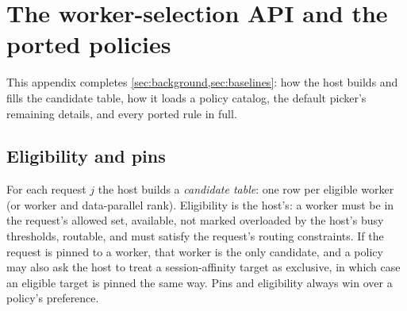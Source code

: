 %

\section{The worker-selection API and the ported policies}
\label{app:api}

This appendix completes \cref{sec:background,sec:baselines}: how the host builds and fills the
candidate table, how it loads a policy catalog, the default picker's remaining details, and every
ported rule in full.

\subsection{Eligibility and pins}

For each request $j$ the host builds a \emph{candidate table}: one row per eligible worker (or
worker and data-parallel rank). Eligibility is the host's: a worker must be in the request's
allowed set, available, not marked overloaded by the host's busy thresholds, routable, and must
satisfy the request's routing constraints. If the request is pinned to a worker, that worker is
the only candidate, and a policy may also ask the host to treat a session-affinity target as
exclusive, in which case an eligible target is pinned the same way. Pins and eligibility always
win over a policy's preference.

